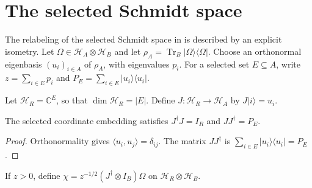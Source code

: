\section{The selected Schmidt space}
\label{sec:typical_pure_compression}

The relabeling of the selected Schmidt space in
\cite[Section~7]{OpenAI2026AreaLaw} is described by an explicit isometry.
Let $\Omega\in\mathcal H_A\otimes\mathcal H_B$ and let
$\rho_A=\operatorname{Tr}_B|\Omega\rangle\langle\Omega|$.
Choose an orthonormal eigenbasis $(u_i)_{i\in A}$ of $\rho_A$, with
eigenvalues $p_i$. For a selected set $E\subseteq A$, write
$z=\sum_{i\in E}p_i$ and
$P_E=\sum_{i\in E}|u_i\rangle\langle u_i|$.

\begin{definition}
\label{def:typical_selection_embedding}
\leanok
Let $\mathcal H_R=\mathbb C^E$, so that $\dim\mathcal H_R=|E|$.
Define $J:\mathcal H_R\to\mathcal H_A$ by $J|i\rangle=u_i$.
\end{definition}

\begin{theorem}
\label{thm:typical_selection_embedding}
\leanok
The selected coordinate embedding satisfies $J^\dagger J=I_R$ and
$JJ^\dagger=P_E$.
\end{theorem}
\begin{proof}
\leanok
{}
Orthonormality gives $\langle u_i,u_j\rangle=\delta_{ij}$.
The matrix $JJ^\dagger$ is
$\sum_{i\in E}|u_i\rangle\langle u_i|=P_E$.
\end{proof}

\begin{definition}
\label{def:compressed_typical_vector}
\leanok
{}
If $z>0$, define
$\chi=z^{-1/2}(J^\dagger\otimes I_B)\Omega$
on $\mathcal H_R\otimes\mathcal H_B$.
\end{definition}

